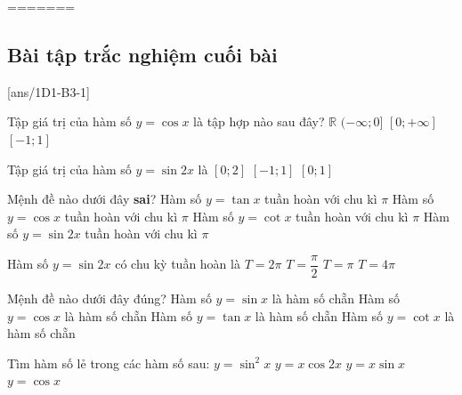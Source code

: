 


=======
\subsection{Bài tập trắc nghiệm cuối bài}
\TN
\setcounter{ex}{0}
[ans/1D1-B3-1]
\begin{ex}%
	Tập giá trị của hàm số $y= \cos x$ là tập hợp nào sau đây?
	\choice
	{$\mathbb{R}$}
	{$(-\infty; 0]$}
	{$[0; +\infty]$}
	{\True $ [-1; 1]$}
\end{ex}

\begin{ex}%
	Tập giá trị của hàm số $y=\sin 2x$ là
	\choice{$[-2;2]$}
	{$[0;2]$}
	{\True $[-1;1]$}
	{$[0;1]$}
\end{ex}

\begin{ex}%
	Mệnh đề nào dưới đây \textbf{sai}?
	\choice
	{Hàm số $y=\tan x$ tuần hoàn với chu kì $\pi$}
	{\True Hàm số $y=\cos x$ tuần hoàn với chu kì $\pi$}
	{Hàm số $y=\cot x$ tuần hoàn với chu kì $\pi$}
	{Hàm số $y=\sin2x$ tuần hoàn với chu kì $\pi$}
\end{ex}

\begin{ex}%
	Hàm số $y=\sin 2x$ có chu kỳ tuần hoàn là
	\choice
	{$T=2\pi$}
	{$T=\dfrac{\pi}{2}$}
	{\True $T=\pi$}
	{$T=4\pi$}
\end{ex}

\begin{ex}%
	Mệnh đề nào dưới đây đúng?
	\choice
	{Hàm số $y=\sin x$ là hàm số chẵn}
	{\True Hàm số $y=\cos x$ là hàm số chẵn}
	{Hàm số $y=\tan x$ là hàm số chẵn}
	{Hàm số $y=\cot x$ là hàm số chẵn}
\end{ex}

\begin{ex}%
	Tìm hàm số lẻ trong các hàm số sau:
	\choice
	{$y=\sin^2x$}
	{\True $y=x\cos2x$}
	{ $y=x\sin x$}
	{$y=\cos x$}	
	
\end{ex}

